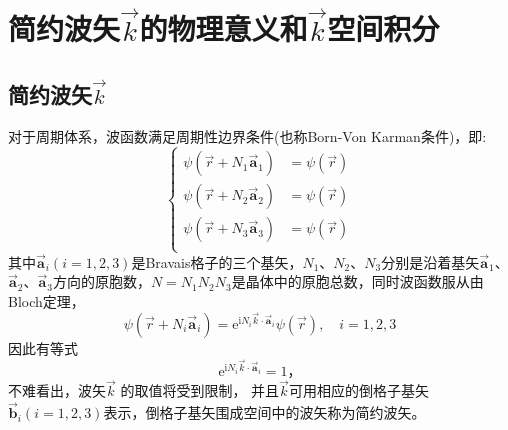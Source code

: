 \chapter{简约波矢$\vec k$的物理意义和$\vec k$空间积分}
\section{简约波矢$\vec k$}
对于周期体系，波函数满足周期性边界条件(也称\textrm{Born-Von Karman}条件)，即:~
\begin{equation}
  \left\{
  \begin{aligned}
     \psi(\vec r+N_1\vec{\mathbf a}_1)&=\psi(\vec r)\\
     \psi(\vec r+N_2\vec{\mathbf a}_2)&=\psi(\vec r)\\
     \psi(\vec r+N_3\vec{\mathbf a}_3)&=\psi(\vec r)\\
   \end{aligned}\right.
  \label{eq:solid-31}
\end{equation}
其中$\vec{\mathbf a}_i(i=1,2,3)$是\textrm{Bravais}格子的三个基矢，$N_1$、$N_2$、$N_3$分别是沿着基矢$\vec{\mathbf a}_1$、$\vec{\mathbf a}_2$、$\vec{\mathbf a}_3$方向的原胞数，$N=N_1N_2N_3$是晶体中的原胞总数，同时波函数服从由\textrm{Bloch}定理，%
\begin{equation}
	\psi(\vec r+N_i\vec{\mathbf a}_i)=\mathrm{e}^{\mathrm{i}N_i\vec k\cdot\vec{\mathbf a}_i}\psi(\vec r),\quad i=1,2,3
  \label{eq:solid-32}
\end{equation}
因此有等式
\begin{equation}
	\mathrm{e}^{\mathrm{i}N_i\vec k\cdot\vec{\mathbf a}_i}=1，
	\label{eq:solid-33}
\end{equation}
不难看出，波矢$\vec k$%
的取值将受到限制，%
并且$\vec k$可用相应的倒格子基矢$\vec{\mathbf b}_i(i=1,2,3)$表示，倒格子基矢围成空间中的波矢称为简约波矢。%

